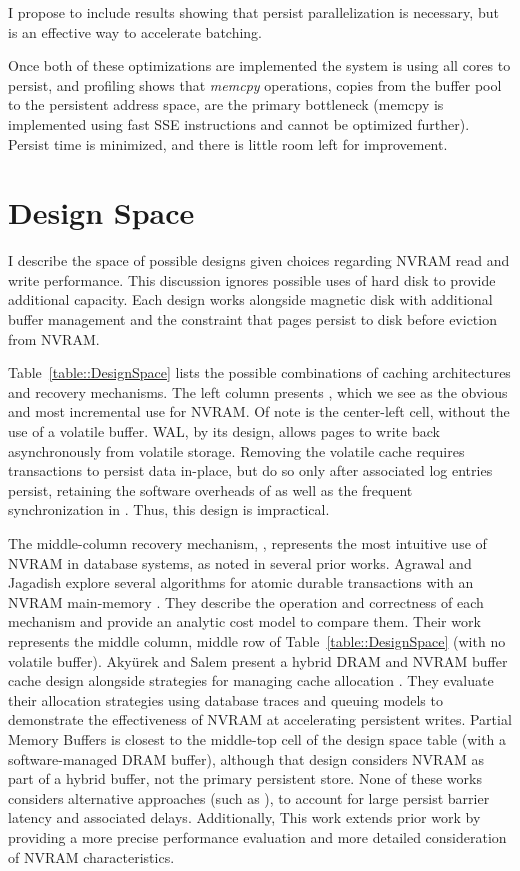 I propose to include results showing that persist parallelization is necessary, but is an effective way to accelerate batching.

Once both of these optimizations are implemented the system is using all cores to persist, and profiling shows that \emph{memcpy} operations, copies from the buffer pool to the persistent address space, are the primary bottleneck (memcpy is implemented using fast SSE instructions and cannot be optimized further).
Persist time is minimized, and there is little room left for improvement.

\section{Design Space}
\label{sec:OLTP_design:Designs}
I describe the space of possible designs given choices regarding NVRAM read and write performance.
This discussion ignores possible uses of hard disk to provide additional capacity.
Each design works alongside magnetic disk with additional buffer management and the constraint that pages persist to disk before eviction from NVRAM.

Table~\ref{table::DesignSpace} lists the possible combinations of caching architectures and recovery mechanisms.
The left column presents \NVDisk, which we see as the obvious and most incremental use for NVRAM.
Of note is the center-left cell, \NVDisk without the use of a volatile buffer.
WAL, by its design, allows pages to write back asynchronously from volatile storage.
Removing the volatile cache requires transactions to persist data in-place, but do so only after associated log entries persist, retaining the software overheads of \NVDisk as well as the frequent synchronization in \InPlace.
Thus, this design is impractical.

The middle-column recovery mechanism, \InPlace, represents the most intuitive use of NVRAM in database systems, as noted in several prior works.
Agrawal and Jagadish explore several algorithms for atomic durable transactions with an NVRAM main-memory \cite{AgrawalJagadish89}.
They describe the operation and correctness of each mechanism and provide an analytic cost model to compare them.
Their work represents the middle column, middle row of Table~\ref{table::DesignSpace} (\InPlace with no volatile buffer).
Aky\"{u}rek and Salem present a hybrid DRAM and NVRAM buffer cache design alongside strategies for managing cache allocation \cite{SalemAkyrek95}.
They evaluate their allocation strategies using database traces and queuing models to demonstrate the effectiveness of NVRAM at accelerating persistent writes.
Partial Memory Buffers is closest to the middle-top cell of the design space table (\InPlace with a software-managed DRAM buffer), although that design considers NVRAM as part of a hybrid buffer, not the primary persistent store.
None of these works considers alternative approaches (such as \GroupCommit), to account for large persist barrier latency and associated delays.
Additionally, This work extends prior work by providing a more precise performance evaluation and more detailed consideration of NVRAM characteristics.

